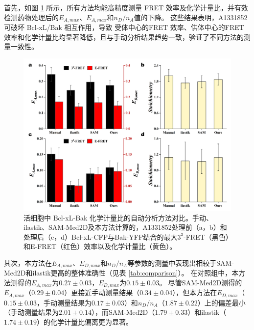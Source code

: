 首先，如图 \ref {fig3} 所示，所有方法均能高精度测量 FRET 效率及化学计量比，并有效检测药物处理后的$E_{A,max}$、$E_{A,max}$和$n_D/n_A$值的下降。
这些结果表明，A1331852可破坏 Bcl-xL/Bak 相互作用，导致 受体中心的FRET 效率、供体中心的FRET效率和化学计量比均显著降低，且与手动分析结果趋势一致，验证了不同方法的测量一致性。
\begin{figure}[!htb]
  \centering
  \includegraphics[width=1\linewidth]{../figures/4/4_方法对比.png}
  \caption[活细胞中 Bcl-xL-Bak 化学计量比的自动分析方法对比]{活细胞中 Bcl-xL-Bak 化学计量比的自动分析方法对比。手动、ilastik、SAM-Med2D及本方法计算的，A1331852处理前（a，b）和处理后（c，d）Bcl-xL-CFP与Bak-YFP结合的最大$3^3$-FRET（黑色）和E-FRET（红色）效率以及化学计量比（黄色）。}\label{fig3}
\end{figure}

其次，本方法在$E_{A,max}$、$E_{D,max}$和$n_D/n_A$等参数的测量中表现出相较于SAM-Med2D和ilastik更高的整体准确性（见表 \ref{tab:comparison}）。
在对照组中，本方法测得的$E_{A,max}$为$0.27\pm0.03$，$E_{D,max}$为$0.15\pm0.03$。
尽管SAM-Med2D测得的$E_{A,max}$（$0.29\pm0.04$）更接近手动测量结果（$0.34\pm0.04$），但本方法在$E_{D,max}$（$0.15\pm0.03$，手动测量结果为$0.17\pm0.03$）和$n_D/n_A$（$1.87\pm0.22$）上的偏差最小（手动测量结果为$2.01\pm0.14$），而SAM-Med2D（$1.79\pm0.33$）和ilastik（$1.74\pm0.19$）的化学计量比偏离更为显著。

